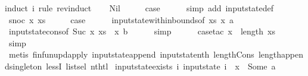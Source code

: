 \begin{isabellebody}
%
\isadelimproof
%
\endisadelimproof
%
\isatagproof
{}\isamarkupfalse%
{\isacharparenleft}induct\ i\ rule{\isacharcolon}\ rev{\isacharunderscore}induct{\isacharparenright}\isanewline
\ \ \isamarkupfalse%
\ Nil\isanewline
\ \ \isamarkupfalse%
\ \isamarkupfalse%
\ {\isacharquery}case\isanewline
\ \ \ \ \isamarkupfalse%
\ {\isacharparenleft}simp\ add{\isacharcolon}\ input{}state{\isacharunderscore}def{\isacharparenright}\isanewline
{}\isamarkupfalse%
\isanewline
\ \ \isamarkupfalse%
\ {\isacharparenleft}snoc\ x\ xs{\isacharparenright}\isanewline
\ \ \isamarkupfalse%
\ \isamarkupfalse%
\ {\isacharquery}case\isanewline
\ \ \ \ \isamarkupfalse%
\ input{}state{\isacharunderscore}within{\isacharunderscore}bounds{\isacharbrackleft}of\ xs\ x{}\ a{\isacharbrackright}\isanewline
\ \ \ \ \isamarkupfalse%
\ input{}state{\isacharunderscore}cons{\isacharbrackleft}of\ {\isachardoublequoteopen}Suc\ x{}{\isachardoublequoteclose}\ {\isachardoublequoteopen}xs\ {\isacharat}\ {\isacharbrackleft}x{\isacharbrackright}{\isachardoublequoteclose}\ b{\isacharbrackright}\isanewline
\ \ \ \ \isamarkupfalse%
\ simp\isanewline
\ \ \ \ \isamarkupfalse%
\ {\isacharparenleft}case{\isacharunderscore}tac\ {\isachardoublequoteopen}x{}\ {\isacharless}\ length\ xs{\isachardoublequoteclose}{\isacharparenright}\isanewline
\ \ \ \ \ \isamarkupfalse%
\ simp\isanewline
\ \ \ \ \isamarkupfalse%
\ {\isacharparenleft}metis\ finfun{\isacharunderscore}upd{\isacharunderscore}apply\ input{}state{\isacharunderscore}append\ input{}state{\isacharunderscore}nth\ length{\isacharunderscore}Cons\ length{\isacharunderscore}append{\isacharunderscore}singleton\ lessI\ list{\isachardot}sel{\isacharparenleft}{}{\isacharparenright}\ nth{\isacharunderscore}tl{\isacharparenright}\isanewline
{}\isamarkupfalse%
%
\endisatagproof
{\isafoldproof}%
%
\isadelimproof
\isanewline
%
\endisadelimproof
\isanewline
{}\isamarkupfalse%
\ input{}state{\isacharunderscore}exists{\isacharcolon}\ {\isachardoublequoteopen}{\isasymexists}i{\isachardot}\ input{}state\ i\ {\isachardollar}\ x{}\ {\isacharequal}\ Some\ a{\isachardoublequoteclose}\isanewline
%
\isadelimproof
%
\endisadelimproof
%
\isatagproof
{}\isamarkupfalse%

\end{isabellebody}
